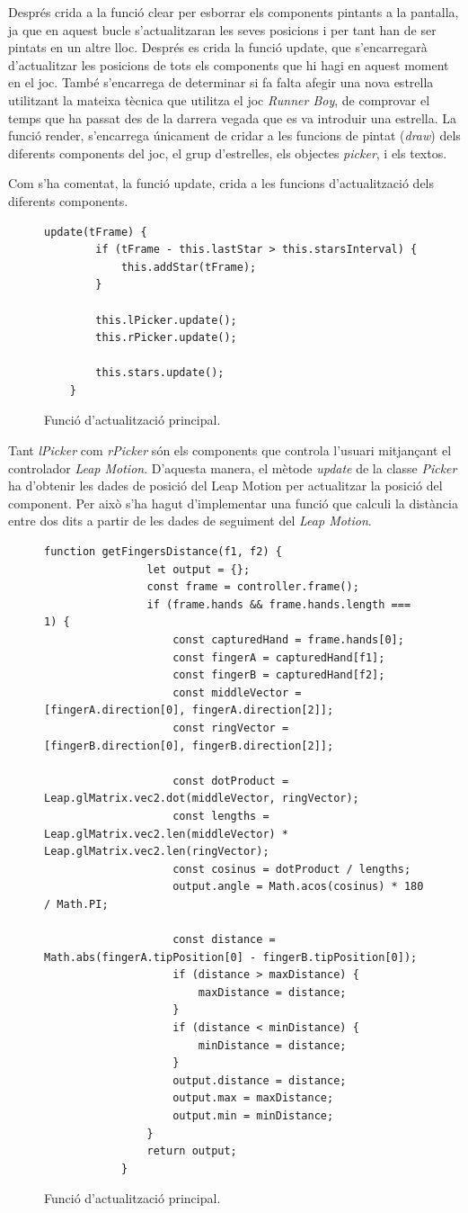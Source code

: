 \documentclass[12pt,a4paper,catalan]{article}
\begin{document}
	Després crida a la funció clear per esborrar els components pintants a la pantalla, ja que en aquest bucle s'actualitzaran les seves posicions i per tant han de ser pintats en un altre lloc.
	Després es crida la funció update, que s'encarregarà d'actualitzar les posicions de tots els components que hi hagi en aquest moment en el joc. També s'encarrega de determinar si fa falta afegir una nova estrella utilitzant la mateixa tècnica que utilitza el joc \textit{Runner Boy}, de comprovar el temps que ha passat des de la darrera vegada que es va introduir una estrella.
	La funció render, s'encarrega únicament de cridar a les funcions de pintat (\textit{draw}) dels diferents components del joc, el grup d'estrelles, els objectes \textit{picker}, i els textos.
	
	Com s'ha comentat, la funció update, crida a les funcions d'actualització dels diferents components.
	\begin{figure}[H]
	\begin{lstlisting}[]
	update(tFrame) {
		if (tFrame - this.lastStar > this.starsInterval) {
			this.addStar(tFrame);
		}
		
		this.lPicker.update();
		this.rPicker.update();
		
		this.stars.update();
	}
	\end{lstlisting}
	\caption{Funció d'actualització principal.}
	\label{fig:catch-stars-update}
	\end{figure}
	Tant \textit{lPicker} com \textit{rPicker} són els components que controla l'usuari mitjançant el controlador \textit{Leap Motion}. D'aquesta manera, el mètode \textit{update} de la classe \textit{Picker} ha d'obtenir les dades de posició del Leap Motion per actualitzar la posició del component.
	Per això s'ha hagut d'implementar una funció que calculi la distància entre dos dits a partir de les dades de seguiment del \textit{Leap Motion}.
	\begin{figure}[H]
		\begin{lstlisting}[gobble=12, tabsize=4]
			function getFingersDistance(f1, f2) {
				let output = {};
				const frame = controller.frame();
				if (frame.hands && frame.hands.length === 1) {
					const capturedHand = frame.hands[0];
					const fingerA = capturedHand[f1];
					const fingerB = capturedHand[f2];
					const middleVector = [fingerA.direction[0], fingerA.direction[2]];
					const ringVector = [fingerB.direction[0], fingerB.direction[2]];
					
					const dotProduct = Leap.glMatrix.vec2.dot(middleVector, ringVector);
					const lengths = Leap.glMatrix.vec2.len(middleVector) * Leap.glMatrix.vec2.len(ringVector);
					const cosinus = dotProduct / lengths;
					output.angle = Math.acos(cosinus) * 180 / Math.PI;
					
					const distance = Math.abs(fingerA.tipPosition[0] - fingerB.tipPosition[0]);
					if (distance > maxDistance) {
						maxDistance = distance;
					}
					if (distance < minDistance) {
						minDistance = distance;
					}
					output.distance = distance;
					output.max = maxDistance;
					output.min = minDistance;
				}
				return output;
			}
		\end{lstlisting}
		\caption{Funció d'actualització principal.}
		\label{fig:catch-stars-update}
	\end{figure}
\end{document}
